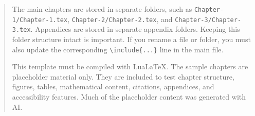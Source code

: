\begin{abstract}
The main chapters are stored in separate folders, such as \texttt{Chapter-1/Chapter-1.tex}, \texttt{Chapter-2/Chapter-2.tex}, and \texttt{Chapter-3/Chapter-3.tex}. Appendices are stored in separate appendix folders. Keeping this folder structure intact is important. If you rename a file or folder, you must also update the corresponding \texttt{\textbackslash include\{...\}} line in the main file.

This template must be compiled with LuaLaTeX. The sample chapters are placeholder material only. They are included to test chapter structure, figures, tables, mathematical content, citations, appendices, and accessibility features. Much of the placeholder content was generated with AI.

\end{abstract}

\makecopyrightpage

\maketitlepage

